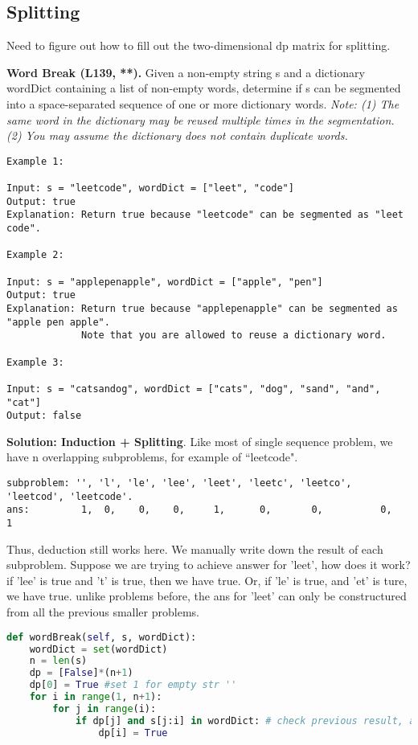 \documentclass[../main.tex]{subfiles}
\begin{document}
\subsection{Splitting}
Need to figure out how to fill out the two-dimensional dp matrix for splitting. 
\begin{examples}[resume]
\item \textbf{Word Break (L139, **).} Given a non-empty string s and a dictionary wordDict containing a list of non-empty words, determine if s can be segmented into a space-separated sequence of one or more dictionary words. \textit{Note: (1) The same word in the dictionary may be reused multiple times in the segmentation. (2) You may assume the dictionary does not contain duplicate words.}
\begin{lstlisting}[numbers=none]
Example 1:

Input: s = "leetcode", wordDict = ["leet", "code"]
Output: true
Explanation: Return true because "leetcode" can be segmented as "leet code".

Example 2:

Input: s = "applepenapple", wordDict = ["apple", "pen"]
Output: true
Explanation: Return true because "applepenapple" can be segmented as "apple pen apple".
             Note that you are allowed to reuse a dictionary word.

Example 3:

Input: s = "catsandog", wordDict = ["cats", "dog", "sand", "and", "cat"]
Output: false
\end{lstlisting}
\textbf{Solution: Induction + Splitting}. Like most of single sequence problem, we have n overlapping subproblems, for example of ``leetcode". 
\begin{lstlisting}[numbers=none]
subproblem: '', 'l', 'le', 'lee', 'leet', 'leetc', 'leetco', 'leetcod', 'leetcode'.
ans:         1,  0,    0,    0,     1,      0,       0,          0,         1
\end{lstlisting}
Thus, deduction still works here. We manually write down the result of each subproblem. Suppose we are trying to achieve answer for 'leet', how does it work?
if 'lee' is true and 't' is true, then we have true. Or, if 'le' is true, and 'et' is ture, we have true. unlike problems before, the ans for 'leet' can only be constructured from all the previous smaller problems. 
\begin{lstlisting}[language=Python]
def wordBreak(self, s, wordDict):
    wordDict = set(wordDict)
    n = len(s) 
    dp = [False]*(n+1)
    dp[0] = True #set 1 for empty str ''
    for i in range(1, n+1):
        for j in range(i):
            if dp[j] and s[j:i] in wordDict: # check previous result, and new word s[j:i]
                dp[i] = True


\end{lstlisting}
\end{examples}
\end{document}
